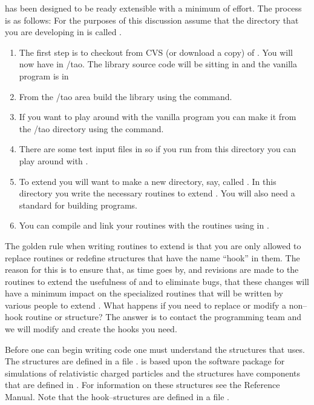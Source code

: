 
\tao has been designed to be ready extensible with a minimum of
effort.  The process is as follows: For the purposes of this
discussion assume that the directory that you are developing \tao in
is called . 
\begin{enumerate}
\item 
The first step is to checkout from CVS (or download a
copy) of \tao. You will now have \tao in
/tao. The library source code will be sitting in 
and the vanilla \tao program is in 
\item 
From the /tao area build the \tao library using the
 command.
\item
If you want to play around with the vanilla \tao program you can make it
from the /tao directory using the  command.
\item
There are some test input files in  so if you run
\tao from this directory you can play around with \tao.
\item
To extend \tao you will want to make a new
directory, say, called . In this directory you write
the necessary routines to extend \tao. You will also need a standard 
 for building programs.
\item
You can compile and link your routines with the \tao routines using
 in .
\end{enumerate}

The golden rule when writing routines to extend \tao is that you are
only allowed to replace routines or redefine structures that have the
name ``hook'' in them. The reason for this is to ensure that, as time
goes by, and revisions are made to the \tao routines to extend the
usefulness of \tao and to eliminate bugs, that these changes will
have a minimum impact on the specialized routines that will be written
by various people to extend \tao.  What happens if you need to replace
or modify a non--hook routine or structure?  The answer is to contact
the \tao programming team and we will modify \tao and create the hooks 
you need.

Before one can begin writing code one must understand the structures
that \tao uses. The structures are defined in a file
.  \tao is based upon the \bmad software
package for simulations of relativistic charged particles and the
\tao structures have components that are defined in \bmad. For
information on these structures see the \bmad Reference Manual. Note
that the hook--structures are defined in a file .

